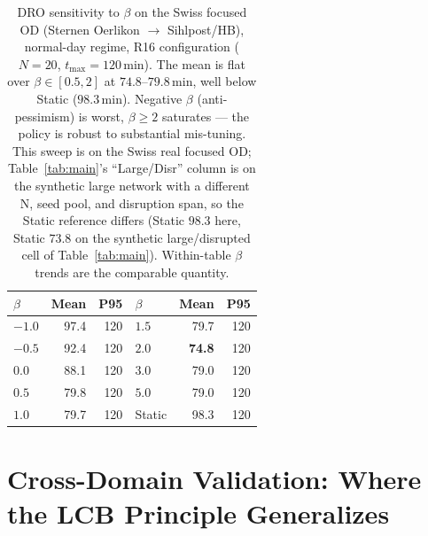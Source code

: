 \documentclass[11pt]{article}
\theoremstyle{definition}
\theoremstyle{remark}
\begin{document}
\begin{table}[t]
\centering
\caption{DRO sensitivity to $\beta$ on the Swiss focused OD
(Sternen Oerlikon $\to$ Sihlpost/HB), normal-day regime, R16
configuration ($N{=}20$, $t_{\max}{=}120$\,min). The mean is
flat over $\beta\in[0.5, 2]$ at $74.8$--$79.8$\,min, well below
Static ($98.3$\,min). Negative $\beta$ (anti-pessimism) is
worst, $\beta\!\geq\!2$ saturates --- the policy is robust
to substantial mis-tuning. This sweep is on the Swiss real
focused OD; Table~\ref{tab:main}'s ``Large/Disr'' column is on
the synthetic large network with a different N, seed pool, and
disruption span, so the Static reference differs (Static $98.3$
here, Static $73.8$ on the synthetic large/disrupted cell of
Table~\ref{tab:main}). Within-table $\beta$ trends are the
comparable quantity.}
\label{tab:beta}
\begin{tabular}{lrr|lrr}
\toprule
$\beta$ & Mean & P95 & $\beta$ & Mean & P95 \\
\midrule
$-1.0$ & 97.4 & 120 & $1.5$ & 79.7 & 120 \\
$-0.5$ & 92.4 & 120 & $2.0$ & \textbf{74.8} & 120 \\
$0.0$ & 88.1 & 120 & $3.0$ & 79.0 & 120 \\
$0.5$ & 79.8 & 120 & $5.0$ & 79.0 & 120 \\
$1.0$ & 79.7 & 120 & Static & 98.3 & 120 \\
\bottomrule
\end{tabular}
\end{table}

\section{Cross-Domain Validation: Where the LCB Principle Generalizes}
\label{sec:cross_domain}
\end{document}
